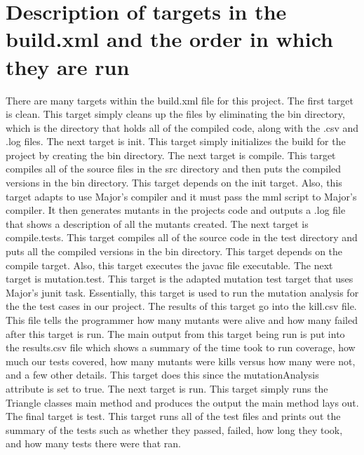 \documentclass[12pt]{article}
\begin{document}
\section{Description of targets in the build.xml and the order in which they are run}
\label{sec:two}
\vspace*{-.1in}
There are many targets within the build.xml file for this project. The first target is clean. This target simply cleans up the files by eliminating the bin directory, which is the directory that holds all of the compiled code, along with the .csv and .log files. The next target is init. This target simply initializes the build for the project by creating the bin directory. The next target is compile. This target compiles all of the source files in the src directory and then puts the compiled versions in the bin directory. This target depends on the init target. Also, this target adapts to use Major's compiler and it must pass the mml script to Major's compiler. It then generates mutants in the projects code and outputs a .log file that shows a description of all the mutants created. The next target is compile.tests. This target compiles all of the source code in the test directory and puts all the compiled versions in the bin directory. This target depends on the compile target. Also, this target executes the javac file executable. The next target is mutation.test. This target is the adapted mutation test target that uses Major's junit task. Essentially, this target is used to run the mutation analysis for the the test cases in our project. The results of this target go into the kill.csv file. This file tells the programmer how many mutants were alive and how many failed after this target is run. The main output from this target being run is put into the results.csv file which shows a summary of the time took to run coverage, how much our tests covered, how many mutants were kills versus how many were not, and a few other details. This target does this since the mutationAnalysis attribute is set to true. The next target is run. This target simply runs the Triangle classes main method and produces the output the main method lays out. The final target is test. This target runs all of the test files and prints out the summary of the tests such as whether they passed, failed, how long they took, and how many tests there were that ran.
\end{document}
